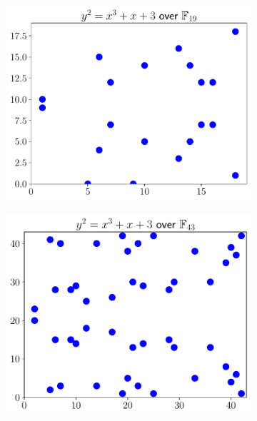 \begin{figure}[p]
\centering
    \begin{subfigure}[t]{0.45\textwidth}
    \includegraphics[width=\textwidth]{plots/ec_finite/ec_finite_F_19_1_3.pdf}
    \end{subfigure}
    \begin{subfigure}[t]{0.45\textwidth}
    \includegraphics[width=\textwidth]{plots/ec_finite/ec_finite_F_43_1_3.pdf}
    \end{subfigure}


\end{figure}
